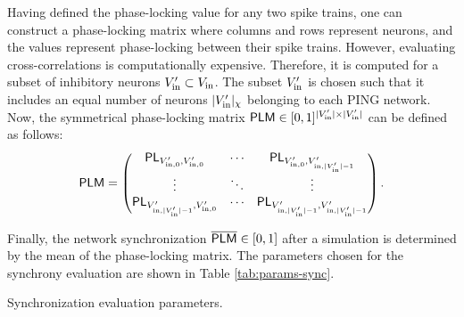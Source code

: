 Having defined the phase-locking value for any two spike trains, one can construct a phase-locking matrix where columns and rows represent neurons, and the values represent phase-locking between their spike trains. However, evaluating cross-correlations is computationally expensive. Therefore, it is computed for a subset of inhibitory neurons $V'_{\mathrm{in}} \subset V_{\mathrm{in}}$. The subset $V'_{\mathrm{in}}$ is chosen such that it includes an equal number of neurons $|V'_{\mathrm{in}}|_\chi$ belonging to each PING network. Now, the symmetrical phase-locking matrix $\mathsf{PLM} \in [0, 1]^{|V'_{\mathrm{in}}| \times |V'_{\mathrm{in}}|}$ can be defined as follows:
\begin{equation}
    \mathsf{PLM} = \begin{pmatrix}
        \mathsf{PL}_{V'_{\mathrm{in}, 0}, V'_{\mathrm{in}, 0}} & \cdots  & \mathsf{PL}_{V'_{\mathrm{in}, 0}, V'_{\mathrm{in}, |V'_{\mathrm{in}}|-1}}  \\
        \vdots & \ddots & \vdots  \\
        \mathsf{PL}_{V'_{\mathrm{in}, |V'_{\mathrm{in}}|-1}, V'_{\mathrm{in}, 0}} & \cdots  &  \mathsf{PL}_{V'_{\mathrm{in}, |V'_{\mathrm{in}}|-1}, V'_{\mathrm{in}, |V'_{\mathrm{in}}|-1}}
    \end{pmatrix}.
\end{equation}

Finally, the network synchronization $\overline{\mathsf{PLM}} \in [0, 1]$ after a simulation is determined by the mean of the phase-locking matrix.
The parameters chosen for the synchrony evaluation are shown in Table \ref{tab:params-sync}.

\begin{table}[!htp]
    \centering
    
    \caption{Synchronization evaluation parameters.}
    \label{tab:params-sync}
\end{table}




